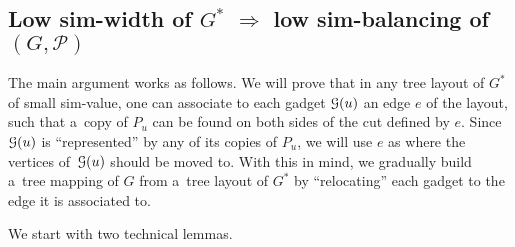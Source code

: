 \documentclass[a4paper,UKenglish,cleveref,hyperref,autoref]{lipics-v2021}
\renewcommand{\leq}{\leqslant}
\renewcommand{\le}{\leq}
\newcommand{\tmap}{tree mapping\xspace}
\begin{document}
\subsection{Low sim-width of $G^*$ $\Rightarrow$ low sim-balancing of~$(G,\mathcal P)$}\label{sec:sim-width-to-sim-balancing}

%	


The main argument works as follows.
We will prove that in any tree layout of $G^*$ of small sim-value, one can associate to each gadget $\mathcal G(u)$ an edge $e$ of the layout, such that a~copy of $P_u$ can be found on both sides of the cut defined by $e$.
Since $\mathcal G(u)$ is ``represented'' by any of its copies of $P_u$, we will use $e$ as where the vertices of~$\mathcal G(u)$ should be moved to.
With this in mind, we gradually build a~\tmap of $G$ from a~tree layout of $G^*$ by ``relocating'' each gadget to the edge it is associated to.

We start with two technical lemmas.
\end{document}
